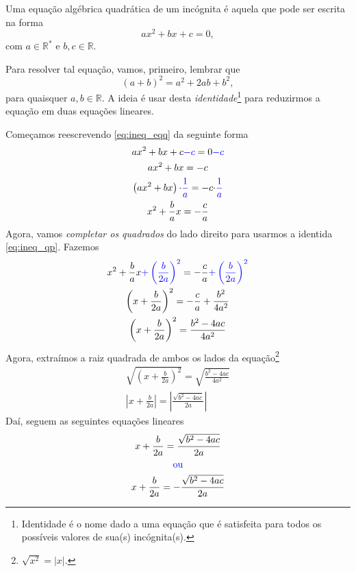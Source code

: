 Uma equação algébrica quadrática de um incógnita é aquela que pode ser escrita na forma
\begin{equation}\label{eq:ineq_eqq}
  ax^2 + bx + c = 0,
\end{equation}
com $a\in\mathbb{R}^*$ e $b,c\in\mathbb{R}$.

Para resolver tal equação, vamos, primeiro, lembrar que
\begin{equation}\label{eq:ineq_qp}
  (a + b)^2 = a^2 + 2ab + b^2,
\end{equation}
para quaisquer $a,b\in\mathbb{R}$. A ideia é usar desta \emph{identidade}\footnote{Identidade é o nome dado a uma equação que é satisfeita para todos os possíveis valores de sua(s) incógnita(s).} para reduzirmos a equação em duas equações lineares.

Começamos reescrevendo \eqref{eq:ineq_eqq} da seguinte forma
\begin{gather}
  ax^2 + bx + c {\color{blue}- c} = 0 {\color{blue}- c}\\
  ax^2 + bx = -c\\
  \left(ax^2 + bx\right){\cdot \color{blue}\frac{1}{a}} = -c{\cdot \color{blue}\frac{1}{a}} \\
  x^2 + \frac{b}{a}x = -\frac{c}{a}
\end{gather}
Agora, vamos \emph{completar os quadrados} do lado direito para usarmos a identida \eqref{eq:ineq_qp}. Fazemos
\begin{gather}
  x^2 + \frac{b}{a}x {\color{blue}+ \left(\frac{b}{2a}\right)^2} = -\frac{c}{a}  {\color{blue}+ \left(\frac{b}{2a}\right)^2} \\
  \left(x + \frac{b}{2a}\right)^2 = -\frac{c}{a} + \frac{b^2}{4a^2} \\
  \left(x + \frac{b}{2a}\right)^2 = \frac{b^2 - 4ac}{4a^2}
\end{gather}
Agora, extraímos a raiz quadrada de ambos os lados da equação\footnote{$\sqrt{x^2}=|x|$.}
\begin{gather}
  \sqrt{\left(x + \frac{b}{2a}\right)^2} = \sqrt{\frac{b^2 - 4ac}{4a^2}} \\
  \left|x + \frac{b}{2a}\right| = \left|\frac{\sqrt{b^2 - 4ac}}{2a}\right|
\end{gather}
Daí, seguem as seguintes equações lineares
\begin{gather}
  x + \frac{b}{2a} = \frac{\sqrt{b^2 - 4ac}}{2a}\\
  {\color{blue}\text{ou}}\nonumber\\
  x + \frac{b}{2a} = -\frac{\sqrt{b^2 - 4ac}}{2a}\\
\end{gather}

